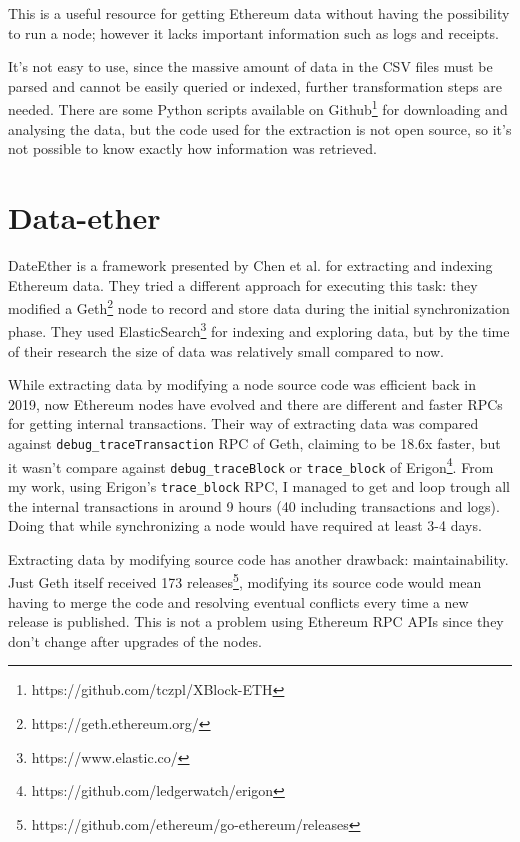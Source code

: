 This is a useful resource for getting Ethereum data without having the possibility to run a node; however it lacks important information such as logs and receipts. 

It's not easy to use, since the massive amount of data in the CSV files must be parsed and cannot be easily queried or indexed, further transformation steps are needed. There are some Python scripts available on Github\footnote{https://github.com/tczpl/XBlock-ETH} for downloading and analysing the data, but the code used for the extraction is not open source, so it's not possible to know exactly how information was retrieved.

\section{Data-ether}

DateEther \cite{dataether} is a framework presented by Chen et al. for extracting and indexing Ethereum data. They tried a different approach for executing this task: they modified a Geth\footnote{https://geth.ethereum.org/} node to record and store data during the initial synchronization phase. They used ElasticSearch\footnote{https://www.elastic.co/} for indexing and exploring data, but by the time of their research the size of data was relatively small compared to now.

While extracting data by modifying a node source code was efficient back in 2019, now Ethereum nodes have evolved and there are different and faster RPCs for getting internal transactions. Their way of extracting data was compared against \texttt{debug\_traceTransaction} RPC of Geth, claiming to be 18.6x faster, but it wasn't compare against \texttt{debug\_traceBlock} or \texttt{trace\_block} of Erigon\footnote{https://github.com/ledgerwatch/erigon}. From my work, using Erigon's \texttt{trace\_block} RPC, I managed to get and loop trough all the internal transactions in around 9 hours (40 including transactions and logs). Doing that while synchronizing a node would have required at least 3-4 days. 

Extracting data by modifying source code has another drawback: maintainability. Just Geth itself received 173 releases\footnote{https://github.com/ethereum/go-ethereum/releases}, modifying its source code would mean having to merge the code and resolving eventual conflicts every time a new release is published. This is not a problem using Ethereum RPC APIs since they don't change after upgrades of the nodes.

